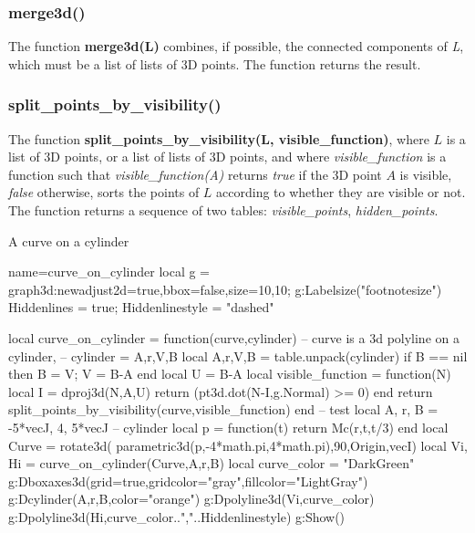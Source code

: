 \subsubsection{merge3d()}
The function \textbf{merge3d(L)} combines, if possible, the connected components of \emph{L}, which must be a list of lists of 3D points. The function returns the result.

\subsubsection{split\_points\_by\_visibility()}
The function \textbf{split\_points\_by\_visibility(L, visible\_function)}, where $L$ is a list of 3D points, or a list of lists of 3D points, and where \emph{visible\_function} is a function such that \emph{visible\_function(A)} returns \emph{true} if the 3D point $A$ is visible, \emph{false} otherwise, sorts the points of $L$ according to whether they are visible or not. The function returns a sequence of two tables: \emph{visible\_points}, \emph{hidden\_points}.

\begin{demo}{A curve on a cylinder}
\begin{luadraw}{name=curve_on_cylinder}
local g = graph3d:new{adjust2d=true,bbox=false,size={10,10}};
g:Labelsize("footnotesize")
Hiddenlines = true; Hiddenlinestyle = "dashed"

local curve_on_cylinder = function(curve,cylinder) 
-- curve is a 3d polyline on a cylinder, 
-- cylinder = {A,r,V,B}
    local  A,r,V,B = table.unpack(cylinder)
    if B == nil then B = V; V = B-A end
    local U = B-A
    local visible_function = function(N)
        local I = dproj3d(N,{A,U})
        return (pt3d.dot(N-I,g.Normal) >= 0)
    end
    return split_points_by_visibility(curve,visible_function)
end
-- test
local A, r, B = -5*vecJ, 4, 5*vecJ -- cylinder
local p = function(t) return Mc(r,t,t/3) end
local Curve = rotate3d( parametric3d(p,-4*math.pi,4*math.pi),90,{Origin,vecI})
local Vi, Hi = curve_on_cylinder(Curve,{A,r,B})
local curve_color = "DarkGreen"
g:Dboxaxes3d({grid=true,gridcolor="gray",fillcolor="LightGray"})
g:Dcylinder(A,r,B,{color="orange"})
g:Dpolyline3d(Vi,curve_color)
g:Dpolyline3d(Hi,curve_color..","..Hiddenlinestyle)
g:Show()
\end{luadraw}
\end{demo}
